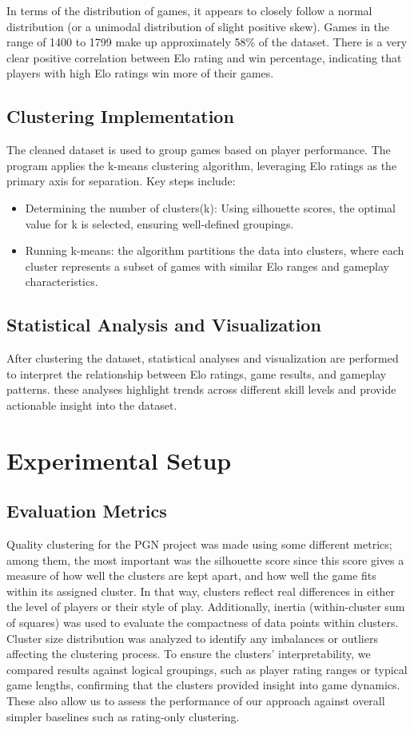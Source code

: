 \documentclass[conference]{IEEEtran}
\begin{document}
In terms of the distribution of games, it appears to closely follow a normal distribution (or a unimodal distribution of slight positive skew). Games in the range of 1400 to 1799 make up approximately 58\% of the dataset. There is a very clear positive correlation between Elo rating and win percentage, indicating that players with high Elo ratings win more of their games.

\subsection{Clustering Implementation}
 The cleaned dataset is used to group games based on player performance. The program applies the k-means clustering algorithm, leveraging Elo ratings as the primary axis for separation. Key steps include:
\begin{itemize}
    \item Determining the number of clusters(k): Using silhouette scores, the optimal value for k is selected, ensuring well-defined groupings.
    \item Running k-means: the algorithm partitions the data into clusters, where each cluster represents a subset of games with similar Elo ranges and gameplay characteristics.
\end{itemize}

\subsection{Statistical Analysis and Visualization}
After clustering the dataset, statistical analyses and visualization are performed to interpret the relationship between Elo ratings, game results, and gameplay patterns. these analyses highlight trends across different skill levels and provide actionable insight into the dataset.


\section{Experimental Setup}

\subsection{Evaluation Metrics}
Quality clustering for the PGN project was made using some different metrics; among them, the most important was the silhouette score since this score gives a measure of how well the clusters are kept apart, and how well the game fits within its assigned cluster. In that way, clusters reflect real differences in either the level of players or their style of play. Additionally, inertia (within-cluster sum of squares) was used to evaluate the compactness of data points within clusters. Cluster size distribution was analyzed to identify any imbalances or outliers affecting the clustering process. To ensure the clusters' interpretability, we compared results against logical groupings, such as player rating ranges or typical game lengths, confirming that the clusters provided insight into game dynamics. These also allow us to assess the performance of our approach against overall simpler baselines such as rating-only clustering.
\end{document}
